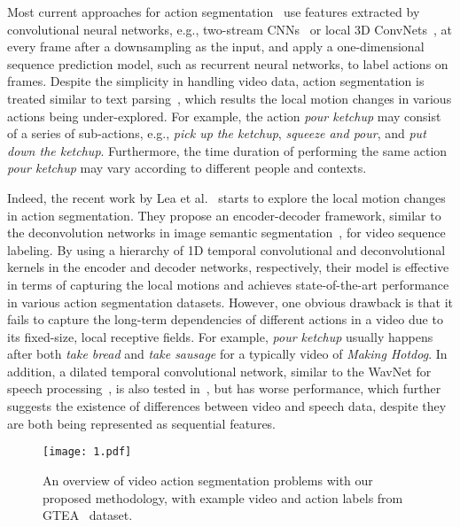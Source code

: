\documentclass{article}
\begin{document}
Most current approaches for action segmentation~\cite{YeRuJiARXIV2015, SiMaJoCVPR2016, HuFeNiECCV2016} use features extracted by convolutional neural networks, e.g., two-stream CNNs~\cite{SiZiNIPS2014} or local 3D ConvNets~\cite{TrBoFeICCV2015}, at every frame after a downsampling as the input, and apply a one-dimensional sequence prediction model, such as recurrent neural networks, to label actions on frames. Despite the simplicity in handling video data, action segmentation is treated similar to text parsing~\cite{CrHuACL2016}, which results the local motion changes in various actions being under-explored. For example, the action \textit{pour ketchup} may consist of a series of sub-actions, e.g., \textit{pick up the ketchup}, \textit{squeeze and pour}, and \textit{put down the ketchup}. Furthermore, the time duration of performing the same action \textit{pour ketchup} may vary according to different people and contexts. 

Indeed, the recent work by Lea et al.~\cite{LeFlViCVPR2017} starts to explore the local motion changes in action segmentation. They propose an encoder-decoder framework, similar to the deconvolution networks in image semantic segmentation~\cite{NoHoHaICCV2015}, for video sequence labeling. By using a hierarchy of 1D temporal convolutional and deconvolutional kernels in the encoder and decoder networks, respectively, their model is effective in terms of capturing the local motions and achieves state-of-the-art performance in various action segmentation datasets. However, one obvious drawback is that it fails to capture the long-term dependencies of different actions in a video due to its fixed-size, local receptive fields. For example, \textit{pour ketchup} usually happens after both \textit{take bread} and \textit{take sausage} for a typically video of \textit{Making Hotdog}. In addition, a dilated temporal convolutional network, similar to the WavNet for speech processing~\cite{OoDiZeARXIV2016}, is also tested in~\cite{LeFlViCVPR2017}, but has worse performance, which further suggests the existence of differences between video and speech data, despite they are both being represented as sequential features. 

\begin{figure}[t]
\centering
\texttt{[image: 1.pdf]}
\caption{An overview of video action segmentation problems with our proposed methodology, with example video and action labels from GTEA~\cite{gtea} dataset.}
\label{f1}
\end{figure}
\end{document}
